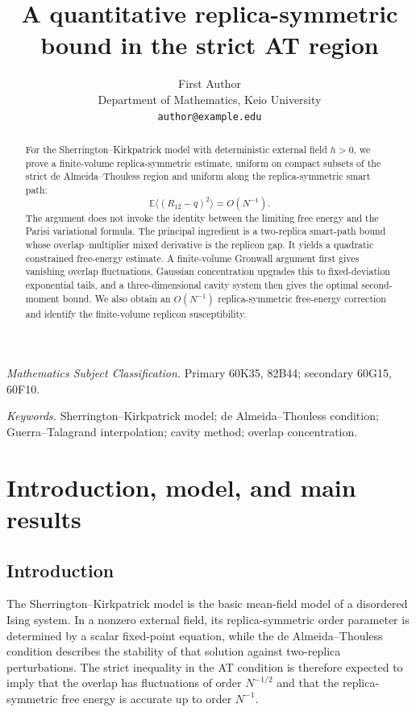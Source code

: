 \documentclass[11pt]{article}
\title{A quantitative replica-symmetric bound in the strict AT region}
\author{First Author\\
Department of Mathematics, Keio University\\
\texttt{author@example.edu}}
\date{}
\numberwithin{equation}{section}
\theoremstyle{plain}
\theoremstyle{definition}
\newcommand{\E}{\mathbb E}
\newcommand{\1}{\mathbf 1}
\begin{document}
\maketitle

\begin{abstract}
For the Sherrington--Kirkpatrick model with deterministic external field
$h>0$, we prove a finite-volume replica-symmetric estimate, uniform on
compact subsets of the strict de Almeida--Thouless region and uniform
along the replica-symmetric smart path:
\[
 \E\big\langle(R_{12}-q)^2\big\rangle=O(N^{-1}).
\]
The argument does not invoke the identity between the limiting free
energy and the Parisi variational formula.  The principal ingredient is
a two-replica smart-path bound whose overlap--multiplier mixed
derivative is the replicon gap.  It yields a quadratic constrained
free-energy estimate.  A finite-volume Gronwall argument first gives
vanishing overlap fluctuations, Gaussian concentration upgrades this
to fixed-deviation exponential tails, and a three-dimensional cavity
system then gives the optimal second-moment bound.  We also obtain an
$O(N^{-1})$ replica-symmetric free-energy correction and identify the
finite-volume replicon susceptibility.
\end{abstract}

\medskip
\noindent\textit{Mathematics Subject Classification.}
Primary 60K35, 82B44; secondary 60G15, 60F10.

\smallskip
\noindent\textit{Keywords.}
Sherrington--Kirkpatrick model; de Almeida--Thouless condition;
Guerra--Talagrand interpolation; cavity method; overlap concentration.

\section{Introduction, model, and main results}\label{sec:intro}

\subsection{Introduction}

The Sherrington--Kirkpatrick model is the basic mean-field model of a
disordered Ising system.  In a nonzero external field, its
replica-symmetric order parameter is determined by a scalar fixed-point
equation, while the de Almeida--Thouless condition describes the
stability of that solution against two-replica perturbations.  The
strict inequality in the AT condition is therefore expected to imply
that the overlap has fluctuations of order $N^{-1/2}$ and that the
replica-symmetric free energy is accurate up to order $N^{-1}$.
\end{document}
